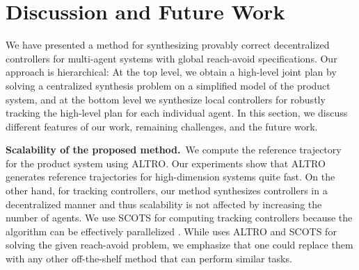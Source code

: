 \section{Discussion and Future Work}
We have presented a method for synthesizing provably correct decentralized controllers for multi-agent systems with global reach-avoid specifications. 
Our approach is hierarchical: At the top level, we obtain a high-level joint plan by solving a centralized synthesis problem on a simplified model of the product system, and at the bottom level we synthesize local controllers for robustly tracking the high-level plan for each individual agent.
In this section, we discuss different features of our work, remaining challenges, and the future work.

\smallskip
\noindent\textbf{Scalability of the proposed method.}\
We compute the reference trajectory for the product system using ALTRO. Our experiments show that ALTRO generates reference trajectories for high-dimension systems quite fast. On the other hand, for tracking controllers, our method synthesizes controllers in a decentralized manner and thus scalability is not affected by increasing the number of agents. We use SCOTS for computing tracking controllers because the algorithm can be effectively parallelized \cite{KhaledZ19pfaces}. While \tool uses ALTRO and SCOTS for solving the given reach-avoid problem, we emphasize that one could replace them with any other off-the-shelf method that can perform similar tasks.

